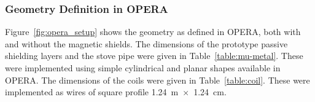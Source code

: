 





\subsubsection{Geometry Definition in OPERA}


Figure~\ref{fig:opera_setup} shows the geometry as defined in OPERA,
both with and without the magnetic shields.  The dimensions of
the prototype passive shielding layers and the stove pipe were given
in Table~\ref{table:mu-metal}.  These were implemented using simple
cylindrical and planar shapes available in OPERA.  The dimensions of
the coils were given in Table~\ref{table:coil}.  These were
implemented as wires of square profile 1.24~m~$\times$~1.24~cm.

